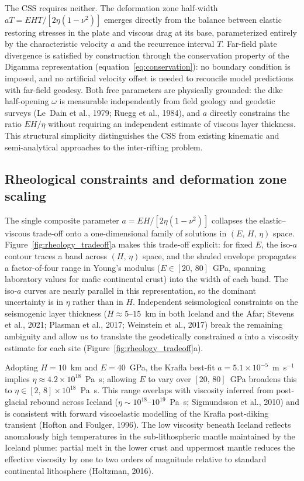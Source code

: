 \documentclass[12pt]{article}
\begin{document}
The CSS requires neither.  The deformation zone half-width
$aT = EHT/[2\eta(1-\nu^2)]$ emerges directly from the balance between elastic
restoring stresses in the plate and viscous drag at its base, parameterized
entirely by the characteristic velocity $a$ and the recurrence interval $T$.
Far-field plate divergence is satisfied by construction through the conservation
property of the Digamma representation (equation~\ref{eq:conservation}): no
boundary condition is imposed, and no artificial velocity offset is needed to
reconcile model predictions with far-field geodesy.  Both free parameters are
physically grounded: the dike half-opening $\omega$ is measurable independently
from field geology and geodetic surveys (Le~Dain et al., 1979; Ruegg et al.,
1984), and $a$ directly constrains the ratio $EH/\eta$ without requiring an
independent estimate of viscous layer thickness.  This structural simplicity
distinguishes the CSS from existing kinematic and semi-analytical approaches
to the inter-rifting problem.

\subsection{Rheological constraints and deformation zone scaling}
\label{sec:disc_rheology}

The single composite parameter $a = EH/[2\eta(1-\nu^2)]$ collapses the
elastic--viscous trade-off onto a one-dimensional family of solutions in
$(E,\,H,\,\eta)$ space.  Figure~\ref{fig:rheology_tradeoff}a makes this
trade-off explicit: for fixed $E$, the iso-$a$ contour traces a band across
$(H,\,\eta)$ space, and the shaded envelope propagates a factor-of-four range
in Young's modulus ($E \in [20,\,80]$~GPa, spanning laboratory values for mafic
continental crust) into the width of each band.  The iso-$a$ curves are nearly
parallel in this representation, so the dominant uncertainty is in $\eta$ rather
than in $H$.  Independent seismological constraints on the seismogenic layer
thickness ($H \approx 5$--$15$~km in both Iceland and the Afar; Stevens et
al., 2021; Plasman et al., 2017; Weinstein et al., 2017) break the remaining
ambiguity and allow us to translate the geodetically constrained $a$ into a
viscosity estimate for each site
(Figure~\ref{fig:rheology_tradeoff}a).

Adopting $H = 10$~km and $E = 40$~GPa, the Krafla best-fit
$a = 5.1\times10^{-5}$~m~s$^{-1}$ implies
$\eta \approx 4.2\times10^{18}$~Pa~s; allowing $E$ to vary over $[20,\,80]$~GPa
broadens this to $\eta \in [2,\,8]\times10^{18}$~Pa~s.  This range overlaps
with viscosity inferred from post-glacial rebound across Iceland
($\eta \sim 10^{18}$--$10^{19}$~Pa~s; Sigmundsson et al., 2010) and is
consistent with forward viscoelastic modelling of the Krafla post-diking
transient (Hofton and Foulger, 1996).  The low viscosity beneath Iceland
reflects anomalously high temperatures in the sub-lithospheric mantle maintained
by the Iceland plume: partial melt in the lower crust and uppermost mantle
reduces the effective viscosity by one to two orders of magnitude relative to
standard continental lithosphere (Holtzman, 2016).
\end{document}
